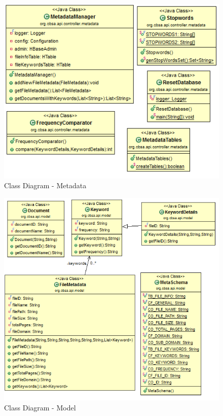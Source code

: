 \documentclass[oneside,a4paper,12pt]{report}
\begin{document}
{\begin{figure}[H]
\includegraphics{class-dig-metadata}
\caption{Class Diagram - Metadata}
\end{figure}

\begin{figure}[H]
\includegraphics{class-dig-model}
\caption{Class Diagram - Model}
\end{figure}

}
\end{document}
